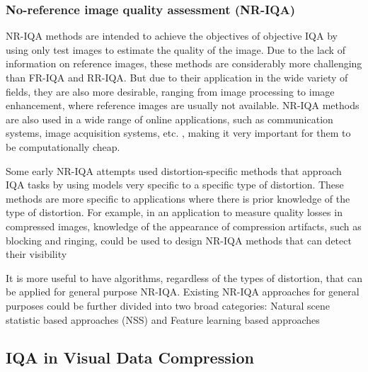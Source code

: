 \subsubsection{No-reference image quality assessment (NR-IQA)}

NR-IQA methods are intended to achieve the objectives of objective IQA by using only test images to estimate the quality of the image. Due to the lack of information on reference images, these methods are considerably more challenging than FR-IQA and RR-IQA. But due to their application in the wide variety of fields, they are also more desirable, ranging from image processing to image enhancement, where reference images are usually not available. NR-IQA methods are also used in a wide range of online applications, such as communication systems, image acquisition systems, etc. \cite{Chandler2013}, making it very important for them to be computationally cheap. 

Some early NR-IQA attempts used distortion-specific methods that approach IQA tasks by using models very specific to a specific type of distortion. These methods are more specific to applications where there is prior knowledge of the type of distortion. For example, in an application to measure quality losses in compressed images, knowledge of the appearance of compression artifacts, such as blocking and ringing, could be used to design NR-IQA methods that can detect their visibility 

It is more useful to have algorithms, regardless of the types of distortion, that can be applied for general purpose NR-IQA. Existing NR-IQA approaches for general purposes could be further divided into two broad categories: Natural scene statistic based approaches (NSS) and Feature learning based approaches


\subsection{IQA in Visual Data Compression}

